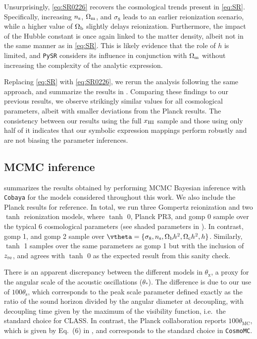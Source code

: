 Unsurprisingly, \cref{eq:SR0226} recovers the cosmological trends
present in \cref{eq:SR}.
Specifically, increasing $n_\mathrm{s}$, $\Omega_\mathrm{m}$, and $\sigma_8$ leads to an
earlier reionization scenario, while a higher value of $\Omega_\mathrm{b}$
slightly delays reionization.
Furthermore, the impact of the Hubble constant is once again linked to
the matter density, albeit not in the same manner as in
\cref{eq:SR}.
This is likely evidence that the role of $h$ is limited, and
\texttt{PySR} considers its influence in conjunction with $\Omega_\mathrm{m}$
without increasing the complexity of the analytic expression.

Replacing \cref{eq:SR} with \cref{eq:SR0226}, we rerun the analysis
following the same approach, and summarize the results in
.
Comparing these findings to our previous results, we observe strikingly
similar values for all cosmological parameters, albeit with smaller
deviations from the Planck results.
The consistency between our results using the full $x_{\mathrm{HI}}$ sample and
those using only half of it indicates that our symbolic expression
mappings perform robustly and are not biasing the parameter inferences.


\subsection*{MCMC inference}
\label{ssec:fits}

 summarizes the results obtained by performing MCMC
Bayesian inference with \texttt{Cobaya} for the models considered
throughout this work.
We also include the Planck results \cite{Planck2020a} for reference.
In total, we run three Gompertz reionization and two $\tanh$
reionization models, where $\tanh$ 0, Planck PR3, and gomp 0 sample over
the typical 6 cosmological parameters (see shaded parameters in
).
In contrast, gomp 1, and gomp 2 sample over $\vtheta = \{\sigma_8, \ns,
\Omegab h^2, \Omegac h^2, h\}$.
Similarly, $\tanh$ 1 samples over the same parameters as gomp 1 but with
the inclusion of $z_{\mathrm{re}}$, and agrees with $\tanh$ 0 as the expected
result from this sanity check.

There is an apparent discrepancy between the different models in
$\theta_\mathrm{x}$, a proxy for the angular scale of the acoustic
oscillations ($\theta_*$).
The difference is due to our use of $100\theta_\mathrm{s}$, which
corresponds to the peak scale parameter defined exactly as the
ratio of the sound horizon divided by the angular diameter at
decoupling, with decoupling time given by the maximum of the visibility
function, i.e.\ the standard choice for CLASS.
In contrast, the Planck collaboration reports $100\theta_\mathrm{MC}$,
which is given by Eq.~(6) in \cite{Planck2014}, and corresponds to the
standard choice in \texttt{CosmoMC}\cite{Lewis2002}.

